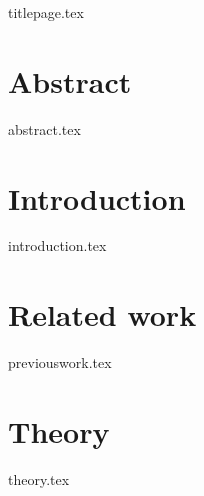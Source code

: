 \documentclass[12pt, a4paper]{report}
\begin{document}
{titlepage.tex}
\afterpage{\blankpage}


\chapter*{Abstract}
{abstract.tex}
\afterpage{\blankpage}

\tableofcontents
\newpage
\afterpage{\blankpage}

\chapter{Introduction} \label{chapter:introduction}
{introduction.tex}

\chapter{Related work} \label{chapter:related}
{previouswork.tex}

\chapter{Theory} \label{chapter:theory}
{theory.tex}
\end{document}
